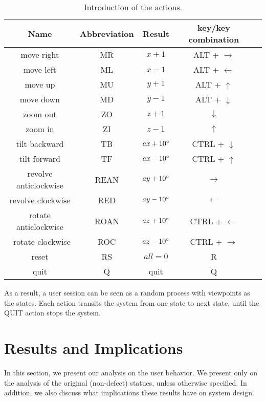 \begin{table}
    \centering
    \begin{tabular}{|c|c|c|c|c|}
        \hline
        Name & Abbreviation & Result & key/key combination \\
        \hline
        move right & MR     & $x + 1$  & ALT + $\rightarrow$\\
        move left  & ML     & $x - 1$  & ALT + $\leftarrow$\\
        move up    & MU     & $y + 1$  & ALT + $\uparrow$\\
        move down  & MD     & $y - 1$  & ALT + $\downarrow$\\
        zoom out   & ZO     & $z + 1$  & $\downarrow$\\
        zoom in    & ZI     & $z - 1$  & $\uparrow$\\
        tilt backward & TB  & $ax + 10^\circ$ & CTRL + $\downarrow$\\
        tilt forward & TF   & $ax - 10^\circ$ & CTRL + $\uparrow$\\
        revolve anticlockwise & REAN & $ay + 10^\circ$ & $\rightarrow$\\
        revolve clockwise & RED & $ay - 10^\circ$ & $\leftarrow$\\
        rotate  anticlockwise & ROAN & $az + 10^\circ$ & CTRL + $\leftarrow$\\\
        rotate  clockwise & ROC &  $az - 10^\circ$ & CTRL + $\rightarrow$\\
        reset      & RS     & $all = 0$  & R \\
        quit       & Q      & quit     & Q \\
        \hline
    \end{tabular}
    \caption{Introduction of the actions.}\label{t:user:action}
\end{table}


As a result, a user session can be seen as a random process 
with viewpoints as the states. Each action transits
the system from one state to next state, until the QUIT
action stops the system.

\section{Results and Implications}
In this section, we present our analysis on the user behavior. We present only on the analysis of the original (non-defect) statues, unless otherwise specified.
In addition, we also discuss what implications these results have on system design.

